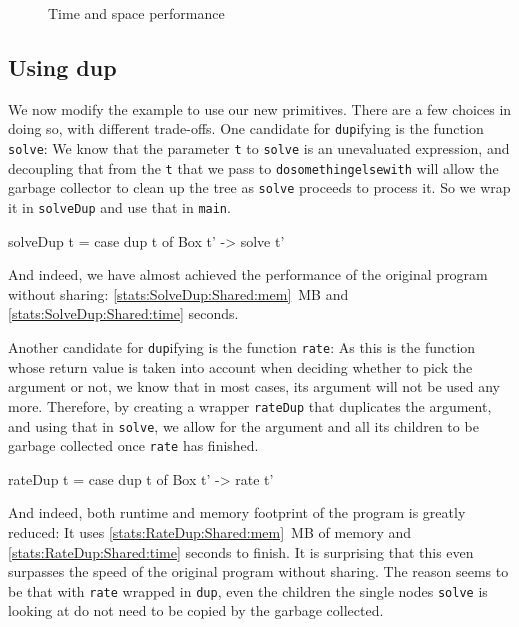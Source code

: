 \documentclass[preprint]{sigplanconf}
\theoremstyle{nonumberplain}
\newcommand{\li}{\lstinline[style=Haskell]}
\begin{document}
\begin{figure*}
\centering

\caption{Time and space performance}
\label{fig:stats}
\end{figure*}

\subsection{Using dup}

We now modify the example to use our new primitives. There are a few choices in doing so, with different trade-offs. One candidate for \li-dup-ifying is the function \li-solve-: We know that the parameter \li-t- to \li-solve- is an unevaluated expression, and decoupling that from the \li-t- that we pass to \li-dosomethingelsewith- will allow the garbage collector to clean up the tree as \li-solve- proceeds to process it. So we wrap it in \li-solveDup- and use that in \li-main-.
\begin{haskell}
solveDup t = case dup t of Box t' -> solve t'
\end{haskell}
And indeed, we have almost achieved the performance of the original program without sharing: \ref{stats:SolveDup:Shared:mem}~MB and \ref{stats:SolveDup:Shared:time} seconds.


Another candidate for \li-dup-ifying is the function \li-rate-:
As this is the function whose return value is taken into account when deciding whether to pick the argument or not, we know that in most cases, its argument will not be used any more. Therefore, by creating a wrapper \li-rateDup- that duplicates the argument, and using that in \li-solve-, we allow for the argument and all its children to be garbage collected once \li-rate- has finished.

\begin{haskell}
rateDup t = case dup t of Box t' -> rate t'
\end{haskell}
And indeed, both runtime and memory footprint of the program is greatly reduced: It uses \ref{stats:RateDup:Shared:mem}~MB of memory and \ref{stats:RateDup:Shared:time} seconds to finish. It is surprising that this even surpasses the speed of the original program without sharing. The reason seems to be  that with \li-rate- wrapped in \li-dup-, even the children the single nodes \li-solve- is looking at do not need to be copied by the garbage collected.
\end{document}
